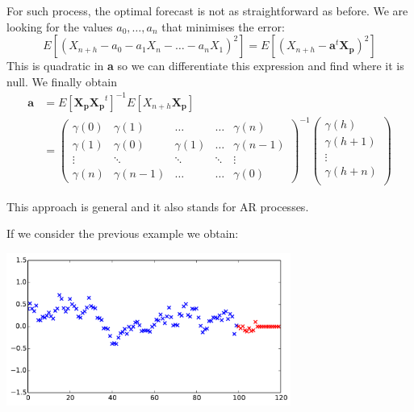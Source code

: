\documentclass{beamer}
\begin{document}
\begin{frame}{}
For such process, the optimal forecast is not as straightforward as before. We are looking for the values $a_0, \dots, a_n$ that minimises the error:
$$ E[(X_{n+h} - a_0 - a_1 X_{n} - \dots -  a_n X_{1})^2] = E[(X_{n+h} - \mathbf{a}^t \mathbf{X_{p}})^2]$$
This is quadratic in \textbf{a} so we can differentiate this expression and find where it is null. We finally obtain
\begin{equation*}
	\begin{split}
\mathbf{a} &=  E[\mathbf{X_{p}} \mathbf{X_{p}}^t]^{-1} E[X_{n+h} \mathbf{X_{p}}]\\
&= 
\begin{pmatrix}
	\gamma(0) & \gamma(1) & \dots 	  & \dots & \gamma(n) \\
	\gamma(1) & \gamma(0) & \gamma(1) & \dots & \gamma(n-1) \\
	\vdots    & \ddots    & \ddots    & \ddots & \vdots \\
	\gamma(n) & \gamma(n-1) & \dots & \dots & \gamma(0) 
\end{pmatrix}^{-1}
\begin{pmatrix}
	\gamma(h) \\
	\gamma(h+1) \\
	\vdots    \\
	\gamma(h+n) \\
\end{pmatrix}
	\end{split}
\end{equation*}
\begin{center}
This approach is general and it also stands for AR processes.
\end{center}
\end{frame}

\begin{frame}{}
If we consider the previous example we obtain:
\begin{center}
\includegraphics[height=5cm]{figures/1_mapred}
\end{center}
\end{frame}
\end{document}
